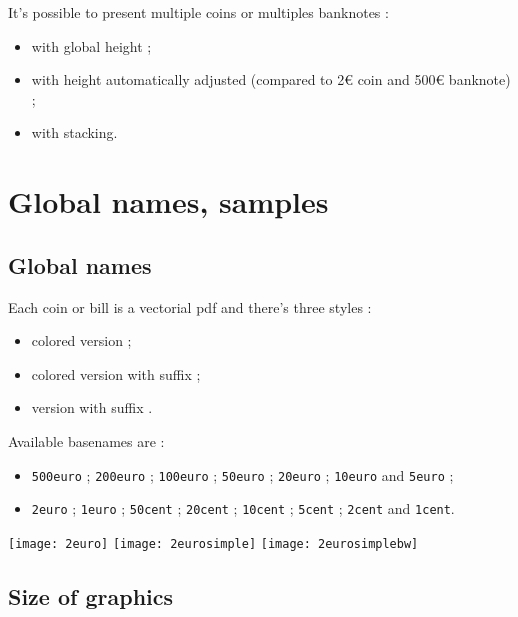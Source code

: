 \documentclass[11pt,a4paper]{ltxdoc}
\begin{document}
It's possible to present multiple coins or multiples banknotes :

\begin{itemize}
	\item with global height ;
	\item with height automatically adjusted (compared to 2€ coin and 500€ banknote) ;
	\item with stacking.
\end{itemize}

\section{Global names, samples}

\subsection{Global names}

Each coin or bill is a vectorial pdf and there's three styles :

\begin{itemize}
	\item {} colored version ;
	\item {} colored version with  suffix ;
	\item {} version with  suffix .
\end{itemize}

Available basenames are :

\begin{itemize}
	\item \texttt{500euro} ; \texttt{200euro} ; \texttt{100euro} ; \texttt{50euro} ; \texttt{20euro} ; \texttt{10euro} and \texttt{5euro} ;
	\item \texttt{2euro} ; \texttt{1euro} ; \texttt{50cent} ; \texttt{20cent} ; \texttt{10cent} ; \texttt{5cent} ; \texttt{2cent} and \texttt{1cent}.
\end{itemize}

\begin{DemoCode}{}
\texttt{[image: 2euro]}%
\texttt{[image: 2eurosimple]}%
\texttt{[image: 2eurosimplebw]}%
\end{DemoCode}

\subsection{Size of graphics}
\end{document}
